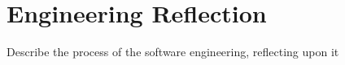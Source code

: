 \chapter{Engineering Reflection}
Describe the process of the software engineering, reflecting upon it
